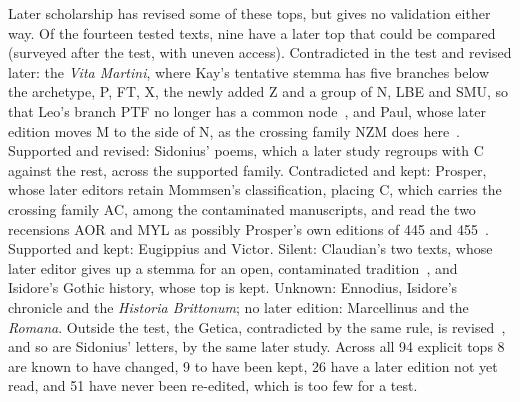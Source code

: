 \documentclass[11pt,a4paper]{article}
\theoremstyle{remark}
\begin{document}
Later scholarship has revised some of these tops, but gives no validation either way. Of the fourteen tested texts, nine have a later top that could be compared (surveyed after the test, with uneven access). Contradicted in the test and revised later: the \emph{Vita Martini}, where Kay's tentative stemma has five branches below the archetype, P, FT, X, the newly added Z and a group of N, LBE and SMU, so that Leo's branch PTF no longer has a common node~\citep[p.~34]{Kay2020}, and Paul, whose later edition moves M to the side of N, as the crossing family NZM does here~\citep{Crivellucci1914}. Supported and revised: Sidonius' poems, which a later study regroups with C against the rest, across the supported family. Contradicted and kept: Prosper, whose later editors retain Mommsen's classification, placing C, which carries the crossing family AC, among the contaminated manuscripts, and read the two recensions AOR and MYL as possibly Prosper's own editions of 445 and 455~\citep[50--52]{BeckerKoetter2016}. Supported and kept: Eugippius and Victor. Silent: Claudian's two texts, whose later editor gives up a stemma for an open, contaminated tradition~\citep[x--xi]{Hall1985}, and Isidore's Gothic history, whose top is kept. Unknown: Ennodius, Isidore's chronicle and the \emph{Historia Brittonum}; no later edition: Marcellinus and the \emph{Romana}. Outside the test, the Getica, contradicted by the same rule, is revised~\citep{Grillone2017}, and so are Sidonius' letters, by the same later study. Across all 94 explicit tops 8 are known to have changed, 9 to have been kept, 26 have a later edition not yet read, and 51 have never been re-edited, which is too few for a test.
\end{document}
